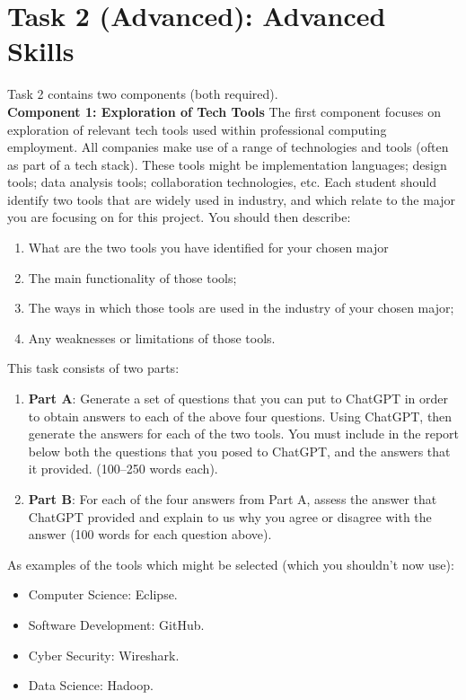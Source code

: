 \documentclass[a4paper, 11pt]{report}
\begin{document}
{\section{Task 2 (Advanced): Advanced Skills}
Task 2 contains two components (both required).\\[2mm]
\textbf{Component 1: Exploration of Tech Tools}
The first component focuses on exploration of relevant tech tools used within professional computing employment. All companies make use of a range of technologies and tools (often as part of a tech stack). These tools might be implementation languages; design tools; data analysis tools; collaboration technologies, etc. Each student should identify two tools that are widely used in industry, and which relate to the major you are focusing on for this project. You should then describe:
\begin{enumerate}
\item What are the two tools you have identified for your chosen major
\item The main functionality of those tools;
\item The ways in which those tools are used in the industry of your chosen major;
\item Any weaknesses or limitations of those tools.
\end{enumerate}
This task consists of two parts:
\begin{enumerate}
\item \textbf{Part A}: Generate a set of questions that you can put to ChatGPT in order to obtain answers to each of the above four questions. Using ChatGPT, then generate the answers for each of the two tools. You must include in the report below both the questions that you posed to ChatGPT, and the answers that it provided.  (100–250 words each).
\item \textbf{Part B}: For each of the four answers from Part A, assess the answer that ChatGPT provided and explain to us why you agree or disagree with the answer (100 words for each question above).
\end{enumerate}
As examples of the tools which might be selected (which you shouldn’t now use):
\begin{itemize}
\item Computer Science: Eclipse.
\item Software Development: GitHub. 
\item Cyber Security: Wireshark. 
\item Data Science: Hadoop.
\end{itemize}
}
\end{document}
